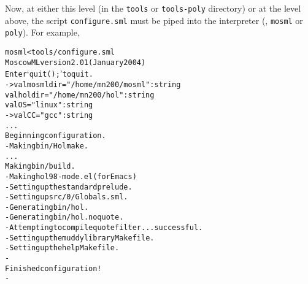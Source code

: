 \noindent Now, at either this level (in the \texttt{tools} or
\texttt{tools-poly} directory) or at the level above, the script
\texttt{configure.sml} must be piped into the \ML{} interpreter (\ie,
\texttt{mosml} or \texttt{poly}).  For example,

\begin{session}
\begin{alltt}
\dol mosml < tools/configure.sml
Moscow ML version 2.01 (January 2004)
Enter `quit();' to quit.
- > val mosmldir = "/home/mn200/mosml" : string
  val holdir = "/home/mn200/hol" : string
  val OS = "linux" : string
- > val CC = "gcc" : string
  ...
Beginning configuration.
- Making bin/Holmake.
  ...
Making bin/build.
- Making hol98-mode.el (for Emacs)
- Setting up the standard prelude.
- Setting up src/0/Globals.sml.
- Generating bin/hol.
- Generating bin/hol.noquote.
- Attempting to compile quote filter ... successful.
- Setting up the muddy library Makefile.
- Setting up the help Makefile.
-
Finished configuration!
-
\dol
\end{alltt}
\end{session}



